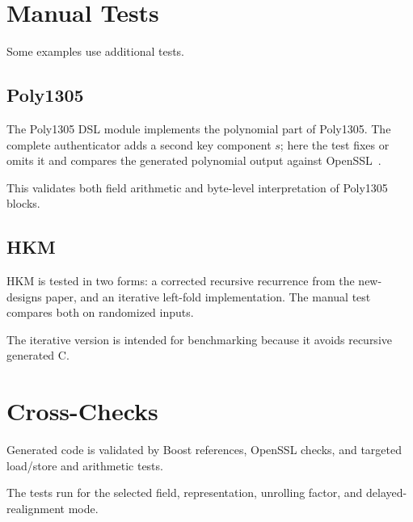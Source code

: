\section{Manual Tests}
\label{sec:manual-tests}

Some examples use additional tests.

\subsection{Poly1305}
\label{subsec:poly1305-tests}

The Poly1305 DSL module implements the polynomial part of Poly1305. The complete authenticator adds a second key component \(s\); here the test fixes or omits it and compares the generated polynomial output against OpenSSL~\cite{openssl}.

This validates both field arithmetic and byte-level interpretation of Poly1305 blocks.

\subsection{HKM}
\label{subsec:hkm-tests}

HKM is tested in two forms: a corrected recursive recurrence from the new-designs paper, and an iterative left-fold implementation. The manual test compares both on randomized inputs.

The iterative version is intended for benchmarking because it avoids recursive generated C.

\section{Cross-Checks}
\label{sec:correctness-cross-checks}

Generated code is validated by Boost references, OpenSSL checks, and targeted load/store and arithmetic tests.

The tests run for the selected field, representation, unrolling factor, and delayed-realignment mode.
